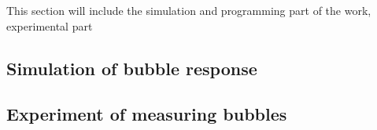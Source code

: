 This section will include the simulation and programming part of the work, experimental part

\subsection{Simulation of bubble response}

\subsection{Experiment of measuring bubbles}